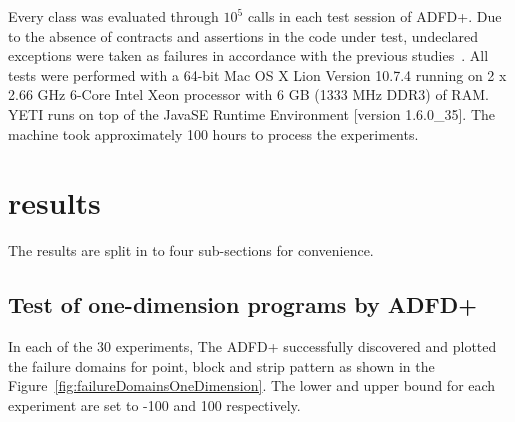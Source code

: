 Every class was evaluated through $10^5$ calls in each test session of ADFD+.
Due to the absence of contracts and assertions in the code under test, undeclared exceptions were taken as failures in accordance with the previous studies~\cite{ahmad2013adfd, Oriol2012}. All tests were performed with a 64-bit Mac OS X Lion Version 10.7.4 running on 2 x 2.66 GHz 6-Core Intel Xeon processor with 6 GB (1333 MHz DDR3) of RAM. YETI runs on top of the Java\texttrademark  SE Runtime Environment [version 1.6.0\_35]. The machine took approximately 100 hours to process the experiments.

\section{results}

The results are split in to four sub-sections for convenience. 






\subsection{Test of one-dimension programs by ADFD+}\label{sec:intro6_10}
In each of the 30 experiments, The ADFD+ successfully discovered and plotted the failure domains for point, block and strip pattern as shown in the Figure~\ref{fig:failureDomainsOneDimension}. The lower and upper bound for each experiment are set to -100 and 100 respectively.

